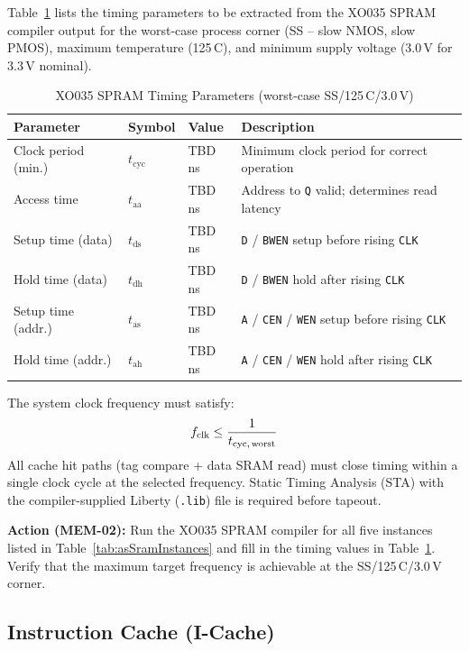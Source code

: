 Table~\ref{tab:asSramTiming} lists the timing parameters to be extracted
from the XO035 SPRAM compiler output for the worst-case process corner
(SS -- slow NMOS, slow PMOS), maximum temperature (125\,\textdegree C),
and minimum supply voltage (3.0\,V for 3.3\,V nominal).

\begin{table}[H]
\caption{XO035 SPRAM Timing Parameters (worst-case SS/125\,\textdegree C/3.0\,V)}
\label{tab:asSramTiming}
\centering
\begin{tabularx}{\textwidth}{|l |l |l |X|}
  \hline
  Parameter & Symbol & Value & Description \\
  \hline
  \hline
  Clock period (min.) & $t_\text{cyc}$ & TBD\,ns & Minimum clock period for correct operation \\
  \hline
  Access time         & $t_\text{aa}$  & TBD\,ns & Address to \texttt{Q} valid; determines read latency \\
  \hline
  Setup time (data)   & $t_\text{ds}$  & TBD\,ns & \texttt{D} / \texttt{BWEN} setup before rising \texttt{CLK} \\
  \hline
  Hold time (data)    & $t_\text{dh}$  & TBD\,ns & \texttt{D} / \texttt{BWEN} hold after rising \texttt{CLK} \\
  \hline
  Setup time (addr.)  & $t_\text{as}$  & TBD\,ns & \texttt{A} / \texttt{CEN} / \texttt{WEN} setup before rising \texttt{CLK} \\
  \hline
  Hold time (addr.)   & $t_\text{ah}$  & TBD\,ns & \texttt{A} / \texttt{CEN} / \texttt{WEN} hold after rising \texttt{CLK} \\
  \hline
\end{tabularx}
\end{table}

The system clock frequency must satisfy:
\[
  f_\text{clk} \leq \frac{1}{t_\text{cyc,\,worst}}
\]
All cache hit paths (tag compare + data SRAM read) must close timing
within a single clock cycle at the selected frequency.
Static Timing Analysis (STA) with the compiler-supplied Liberty
(\texttt{.lib}) file is required before tapeout.

\textbf{Action (MEM-02):} Run the XO035 SPRAM compiler for all five
instances listed in Table~\ref{tab:asSramInstances} and fill in the
timing values in Table~\ref{tab:asSramTiming}.
Verify that the maximum target frequency is achievable at the SS/125\,\textdegree C/3.0\,V corner.

\subsection{Instruction Cache (I-Cache)}

